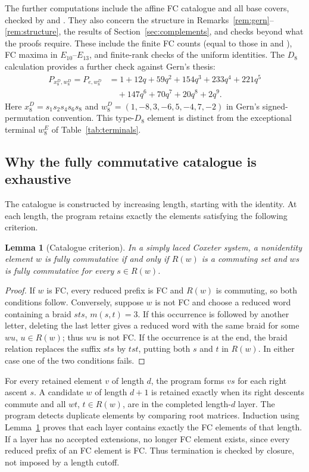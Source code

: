 \documentclass[10pt]{article}
\newtheorem{lemma}[theorem]{Lemma}
\theoremstyle{remark}
\begin{document}
The further computations include the affine FC catalogue and all base
covers, checked by  and .
They also concern the structure in
Remarks~\ref{rem:gern}--\ref{rem:structure}, the results of
Section~\ref{sec:complements}, and checks beyond what the proofs require.
These include the finite FC counts (equal to those in
\cite[Appendix, Table~1]{Stembridge98} and \cite[\S5.1]{BJN}), FC maxima in
$E_{10}$--$E_{13}$, and finite-rank checks of the uniform identities.
The $D_8$ calculation provides a further check against Gern's thesis:
\[
\begin{split}
 P_{x_8^D,w_8^D}=P_{e,w_8^D}
 &=1+12q+59q^2+154q^3+233q^4+221q^5\\
 &\quad+147q^6+70q^7+20q^8+2q^9.
\end{split}
\]
Here $x_8^D=s_1s_2s_4s_6s_8$ and
$w_8^D=(1,-8,3,-6,5,-4,7,-2)$ in Gern's signed-permutation convention.
This type-$D_8$ element is distinct from the exceptional terminal
$w_8^{E}$ of Table~\ref{tab:terminals}.

\subsection{Why the fully commutative catalogue is exhaustive}\label{app:fc}
The catalogue is constructed by increasing length, starting with the
identity. At each length, the program retains exactly the elements
satisfying the following criterion.

\begin{lemma}[Catalogue criterion]\label{lem:fc-catalogue}
In a simply laced Coxeter system, a nonidentity element $w$ is fully
commutative if and only if $R(w)$ is a commuting set and $ws$ is fully
commutative for every $s\in R(w)$.
\end{lemma}
\begin{proof}
If $w$ is FC, every reduced prefix is FC and $R(w)$ is commuting,
so both conditions follow. Conversely, suppose $w$ is not FC and choose
a reduced word containing a braid $sts$, $m(s,t)=3$. If this occurrence
is followed by another letter, deleting the last letter gives a reduced
word with the same braid for some $wu$, $u\in R(w)$; thus $wu$ is not
FC. If the occurrence is at the end, the braid relation replaces the
suffix $sts$ by $tst$, putting both $s$ and $t$ in $R(w)$. In either case
one of the two conditions fails.
\end{proof}

For every retained element $v$ of length $d$, the program forms $vs$
for each right ascent $s$. A candidate $w$ of length $d+1$ is retained
exactly when its right descents commute and all $wt$, $t\in R(w)$,
are in the completed length-$d$ layer. The program detects duplicate
elements by comparing root matrices. Induction using Lemma~\ref{lem:fc-catalogue} proves that each
layer contains exactly the FC elements of that length. If a layer has no
accepted extensions, no longer FC element exists, since every reduced
prefix of an FC element is FC. Thus termination is checked by closure,
not imposed by a length cutoff.
\end{document}
